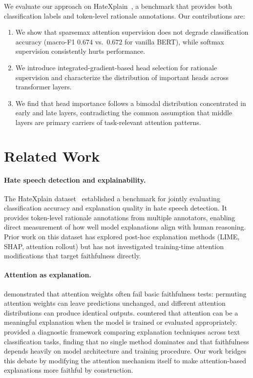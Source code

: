 \documentclass{article}
\begin{document}
We evaluate our approach on HateXplain~\citep{mathew2021hatexplain}, a
benchmark that provides both classification labels and token-level rationale
annotations. Our contributions are:

\begin{enumerate}
  \item We show that sparsemax attention supervision does not degrade
    classification accuracy (macro-F1 $0.674$ vs.\ $0.672$ for vanilla
    BERT), while softmax supervision consistently hurts performance.
  \item We introduce integrated-gradient-based head selection for
    rationale supervision and characterize the distribution of
    important heads across transformer layers.
  \item We find that head importance follows a bimodal distribution
    concentrated in early and late layers, contradicting the common
    assumption that middle layers are primary carriers of task-relevant
    attention patterns.
\end{enumerate}

\section{Related Work}
\label{sec:related}

\paragraph{Hate speech detection and explainability.}
The HateXplain dataset~\citep{mathew2021hatexplain} established a benchmark
for jointly evaluating classification accuracy and explanation quality in
hate speech detection. It provides token-level rationale annotations from
multiple annotators, enabling direct measurement of how well model
explanations align with human reasoning. Prior work on this dataset has
explored post-hoc explanation methods (LIME, SHAP, attention rollout) but
has not investigated training-time attention modifications that target
faithfulness directly.

\paragraph{Attention as explanation.}
\citet{jain2019attention} demonstrated that attention weights often fail
basic faithfulness tests: permuting attention weights can leave predictions
unchanged, and different attention distributions can produce identical
outputs. \citet{wiegreffe2019attention} countered that attention can be
a meaningful explanation when the model is trained or evaluated appropriately.
\citet{atanasova2020diagnostic} provided a diagnostic framework comparing
explanation techniques across text classification tasks, finding that no
single method dominates and that faithfulness depends heavily on model
architecture and training procedure. Our work bridges this debate by
modifying the attention mechanism itself to make attention-based explanations
more faithful by construction.
\end{document}
